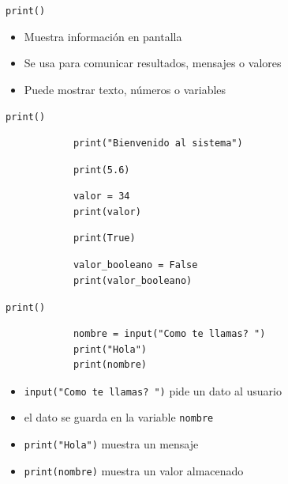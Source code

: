 \documentclass{beamer}
\begin{document}
    \begin{frame}[fragile,t]{\texttt{print()}}
        \begin{itemize}
            \item Muestra información en pantalla
            \item Se usa para comunicar resultados, mensajes o valores
            \item Puede mostrar texto, números o variables
        \end{itemize}
    \end{frame}

    \begin{frame}[fragile,t]{\texttt{print()}}
        \begin{verbatim}
            print("Bienvenido al sistema")
        \end{verbatim}
        \begin{verbatim}
            print(5.6)
        \end{verbatim}
        \begin{verbatim}
            valor = 34
            print(valor)
        \end{verbatim}
        \begin{verbatim}
            print(True)
        \end{verbatim}
        \begin{verbatim}
            valor_booleano = False
            print(valor_booleano)
        \end{verbatim}
    \end{frame}

    \begin{frame}[fragile,t]{\texttt{print()}}
        \begin{verbatim}
            nombre = input("Como te llamas? ")
            print("Hola")
            print(nombre)
        \end{verbatim}

        \begin{itemize}
            \item \texttt{input("Como te llamas? ")} pide un dato al usuario
            \item el dato se guarda en la variable \texttt{nombre}
            \item \texttt{print("Hola")} muestra un mensaje
            \item \texttt{print(nombre)} muestra un valor almacenado
        \end{itemize}
    \end{frame}
\end{document}
